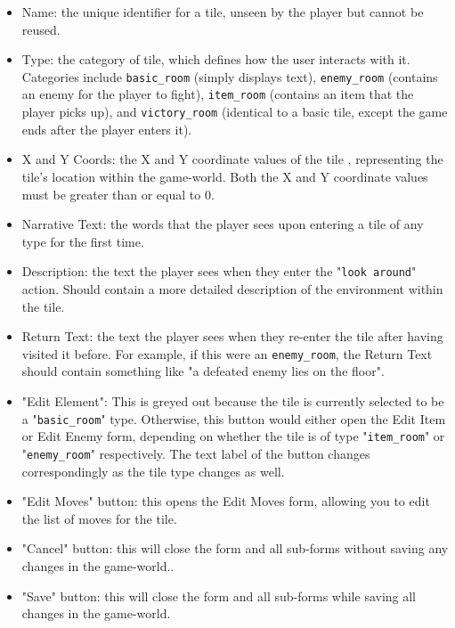\documentclass[class=article,crop=false]{standalone} \usepackage[margin=1in,headheight=57pt,headsep=0.1in]{geometry}
\begin{document}
\begin{itemize}
	\item Name: the unique identifier for a tile, unseen by the player but cannot be reused.
	\item Type: the category of tile, which defines how the user interacts with it. Categories include \texttt{basic\_room} (simply displays text), \texttt{enemy\_room} (contains an enemy for the player to fight), \texttt{item\_room} (contains an item that the player picks up), and \texttt{victory\_room} (identical to a basic tile, except the game ends after the player enters it).
	\item X and Y Coords: the X and Y coordinate values of the tile , representing the tile's location within the game-world. Both the X and Y coordinate values must be greater than or equal to 0.
	\item Narrative Text: the words that the player sees upon entering a tile of any type for the first time.
	\item Description: the text the player sees when they enter the "\texttt{look around}" action. Should contain a more detailed description of the environment within the tile.
	\item Return Text: the text the player sees when they re-enter the tile after having visited it before. For example, if this were an \texttt{enemy\_room}, the Return Text should contain something like "a defeated enemy lies on the floor".
	\item "Edit Element": This is greyed out because the tile is currently selected to be a "\texttt{basic\_room}" type. Otherwise, this button would either open the Edit Item or Edit Enemy form, depending on whether the tile is of type "\texttt{item\_room}" or "\texttt{enemy\_room}" respectively. The text label of the button changes correspondingly as the tile type changes as well.
	\item "Edit Moves" button: this opens the Edit Moves form, allowing you to edit the list of moves for the tile.
	\item "Cancel" button: this will close the form and all sub-forms without saving any changes in the game-world..
	\item "Save" button: this will close the form and all sub-forms while saving all changes in the game-world.
\end{itemize}
\end{document}
